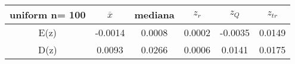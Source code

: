 \begin{tabular}{|c|c|c|c|c|c|}
\hline
uniform n= 100& $\overline{x}$ & mediana & $z_r$ & $z_Q$ & $z_{tr}$ \\ \hline
E(z) & -0.0014 & 0.0008 & 0.0002 & -0.0035 & 0.0149 \\ \hline
D(z) & 0.0093 & 0.0266 & 0.0006 & 0.0141 & 0.0175 \\ \hline
\end{tabular}